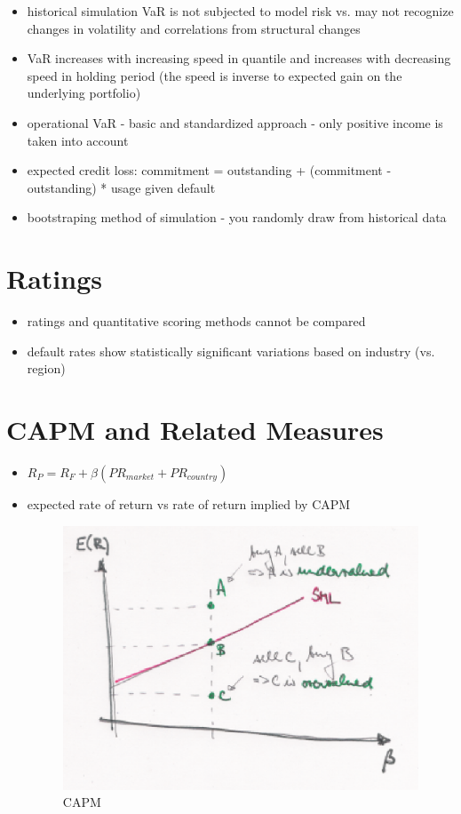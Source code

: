 \begin{itemize}
\item historical simulation VaR is not subjected to model risk vs. may not recognize changes in volatility and correlations from structural changes
\item VaR increases with increasing speed in quantile and increases with decreasing speed in holding period (the speed is inverse to expected gain on the underlying portfolio)
\item operational VaR - basic and standardized approach - only positive income is taken into account
\item expected credit loss: commitment = outstanding + (commitment - outstanding) * usage given default
\item bootstraping method of simulation - you randomly draw from historical data
\end{itemize}

\section{Ratings}

\begin{itemize}
\item ratings and quantitative scoring methods cannot be compared
\item default rates show statistically significant variations based on industry (vs. region)
\end{itemize}

\section{CAPM and Related Measures}

\begin{itemize}
\item $R_P = R_F + \beta(PR_{market} + PR_{country})$
\item expected rate of return vs rate of return implied by CAPM
\begin{figure}[htp]
\centering
\includegraphics[scale = 0.75]{capm.eps}
\caption{CAPM}
\label{CAPM}
\end{figure}
\end{itemize}

